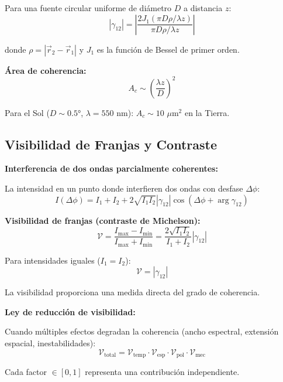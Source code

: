 \documentclass[11pt,a4paper]{article}
\begin{document}
Para una fuente circular uniforme de diámetro $D$ a distancia $z$:
\begin{equation}
    |\gamma_{12}| = \left|\frac{2J_1(\pi D\rho/\lambda z)}{\pi D\rho/\lambda z}\right|
\end{equation}

donde $\rho = |\vec{r}_2 - \vec{r}_1|$ y $J_1$ es la función de Bessel de primer orden.

\textbf{Área de coherencia:}
\begin{equation}
    A_c \sim \left(\frac{\lambda z}{D}\right)^2
\end{equation}

Para el Sol ($D \sim 0.5°$, $\lambda = 550$ nm): $A_c \sim 10$ $\mu$m$^2$ en la Tierra.

\subsection{Visibilidad de Franjas y Contraste}

\textbf{Interferencia de dos ondas parcialmente coherentes:}

La intensidad en un punto donde interfieren dos ondas con desfase $\Delta\phi$:
\begin{equation}
    I(\Delta\phi) = I_1 + I_2 + 2\sqrt{I_1 I_2}|\gamma_{12}|\cos(\Delta\phi + \arg\gamma_{12})
\end{equation}

\textbf{Visibilidad de franjas (contraste de Michelson):}
\begin{equation}
    \mathcal{V} = \frac{I_{\max} - I_{\min}}{I_{\max} + I_{\min}} = \frac{2\sqrt{I_1 I_2}}{I_1 + I_2}|\gamma_{12}|
\end{equation}

Para intensidades iguales ($I_1 = I_2$):
\begin{equation}
    \mathcal{V} = |\gamma_{12}|
\end{equation}

La visibilidad proporciona una medida directa del grado de coherencia.

\begin{importante}
\textbf{Ley de reducción de visibilidad:}

Cuando múltiples efectos degradan la coherencia (ancho espectral, extensión espacial, inestabilidades):
\begin{equation}
    \mathcal{V}_{\text{total}} = \mathcal{V}_{\text{temp}} \cdot \mathcal{V}_{\text{esp}} \cdot \mathcal{V}_{\text{pol}} \cdot \mathcal{V}_{\text{mec}}
\end{equation}

Cada factor $\in [0, 1]$ representa una contribución independiente.
\end{importante}
\end{document}
